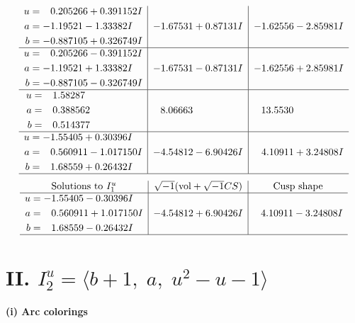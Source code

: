 \documentclass[1p]{elsarticle_modified}
\theoremstyle{definition}
\newcommand{\I}{\sqrt{-1}}
\begin{document}
$$\begin{array}{c|c|c}
\begin{aligned}
u &= \phantom{-}0.205266 + 0.391152 I \\
a &= -1.19521 - 1.33382 I \\
b &= -0.887105 + 0.326749 I\end{aligned}
 & -1.67531 + 0.87131 I & -1.62556 - 2.85981 I \\ \hline\begin{aligned}
u &= \phantom{-}0.205266 - 0.391152 I \\
a &= -1.19521 + 1.33382 I \\
b &= -0.887105 - 0.326749 I\end{aligned}
 & -1.67531 - 0.87131 I & -1.62556 + 2.85981 I \\ \hline\begin{aligned}
u &= \phantom{-}1.58287\phantom{ +0.000000I} \\
a &= \phantom{-}0.388562\phantom{ +0.000000I} \\
b &= \phantom{-}0.514377\phantom{ +0.000000I}\end{aligned}
 & \phantom{-}8.06663\phantom{ +0.000000I} & \phantom{-}13.5530\phantom{ +0.000000I} \\ \hline\begin{aligned}
u &= -1.55405 + 0.30396 I \\
a &= \phantom{-}0.560911 - 1.017150 I \\
b &= \phantom{-}1.68559 + 0.26432 I\end{aligned}
 & -4.54812 - 6.90426 I & \phantom{-}4.10911 + 3.24808 I\\
 \hline 
 \end{array}$$\newpage$$\begin{array}{c|c|c}  
\text{Solutions to }I^u_{1}& \I (\text{vol} + \sqrt{-1}CS) & \text{Cusp shape}\\
 \hline 
\begin{aligned}
u &= -1.55405 - 0.30396 I \\
a &= \phantom{-}0.560911 + 1.017150 I \\
b &= \phantom{-}1.68559 - 0.26432 I\end{aligned}
 & -4.54812 + 6.90426 I & \phantom{-}4.10911 - 3.24808 I\\
 \hline 
 \end{array}$$\newpage\newpage\renewcommand{\arraystretch}{1}
\centering \section*{II. $I^u_{2}= \langle b+1,\;a,\;u^2- u-1 \rangle$}
\flushleft \textbf{(i) Arc colorings}\\
\end{document}

